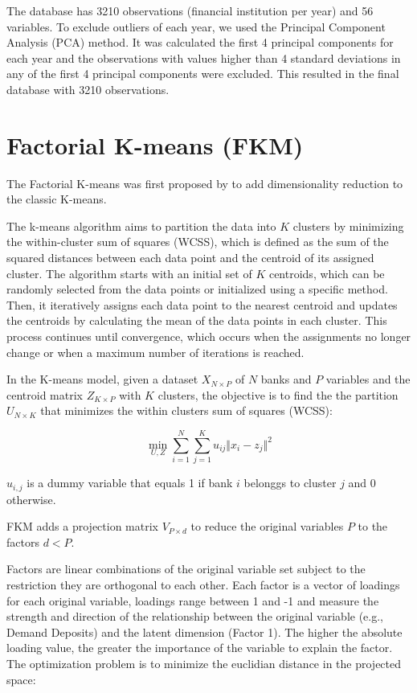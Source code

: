 The database has 3210 observations (financial institution per year) and 56 variables. To exclude outliers of each year, we used the Principal Component Analysis (PCA) method. It was calculated the first 4 principal components for each year and the observations with values higher than 4 standard deviations in any of the first 4 principal components were excluded. This resulted in the final database with 3210 observations.

\section{Factorial K-means (FKM)}

The Factorial K-means was first proposed by  to add dimensionality reduction to the classic K-means.

The k-means algorithm aims to partition the data into $K$ clusters by minimizing the within-cluster sum of squares (WCSS), which is defined as the sum of the squared distances between each data point and the centroid of its assigned cluster. The algorithm starts with an initial set of $K$ centroids, which can be randomly selected from the data points or initialized using a specific method. Then, it iteratively assigns each data point to the nearest centroid and updates the centroids by calculating the mean of the data points in each cluster. This process continues until convergence, which occurs when the assignments no longer change or when a maximum number of iterations is reached.

In the K-means model, given a dataset $X_{N \times P}$ of $N$ banks and $P$ variables and the centroid matrix $Z_{K \times P}$ with $K$ clusters, the objective is to find the the partition $U_{N \times K}$ that minimizes the within clusters sum of squares (WCSS):

\begin{equation}
    \min_{U,Z} \sum_{i=1}^N \sum_{j=1}^K u_{ij} \Vert x_i -z_j \Vert ^2
\end{equation}

$u_{i,j}$ is a dummy variable that equals 1 if bank $i$ belonggs to cluster $j$ and 0 otherwise.

FKM adds a projection matrix $V_{P \times d}$ to reduce the original variables $P$ to the factors $d < P$. 

Factors are linear combinations of the original variable set subject to the restriction they are orthogonal to each other. Each factor is a vector of loadings for each original variable, loadings range between 1 and -1 and measure the strength and direction of the relationship between the original variable (e.g., Demand Deposits) and the latent dimension (Factor 1). The higher the absolute loading value, the greater the importance of the variable to explain the factor. The optimization problem is to minimize the euclidian distance in the projected space:

